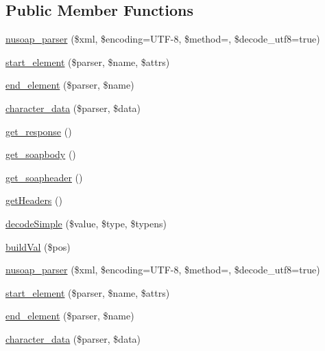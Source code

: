 \subsection*{Public Member Functions}
\begin{DoxyCompactItemize}
\item 
\hyperlink{classnusoap__parser_a0cb4fc7ba2d475205e7a6fcbf187cf23}{nusoap\+\_\+parser} (\$xml, \$encoding=\textquotesingle{}U\+T\+F-\/8\textquotesingle{}, \$method=\textquotesingle{}\textquotesingle{}, \$decode\+\_\+utf8=true)
\item 
\hyperlink{classnusoap__parser_abf9dc4b028eeac08eeca4c7309a950e2}{start\+\_\+element} (\$parser, \$name, \$attrs)
\item 
\hyperlink{classnusoap__parser_ad45367c512cbc2d4679d1a49db3802f2}{end\+\_\+element} (\$parser, \$name)
\item 
\hyperlink{classnusoap__parser_a592a4f9b601cc33f15de0ad7a9c49ae5}{character\+\_\+data} (\$parser, \$data)
\item 
\hyperlink{classnusoap__parser_acf3c69045efc130d3a325c26bd6ac5d0}{get\+\_\+response} ()
\item 
\hyperlink{classnusoap__parser_afa83e4a32b391ea624d012488333c6b1}{get\+\_\+soapbody} ()
\item 
\hyperlink{classnusoap__parser_aeee8c98a38a95c143f807ede81dc06b7}{get\+\_\+soapheader} ()
\item 
\hyperlink{classnusoap__parser_a157e0005d82edaa21cbea07fdc5c62da}{get\+Headers} ()
\item 
\hyperlink{classnusoap__parser_a9094260815e81487fef378ac6222e9a9}{decode\+Simple} (\$value, \$type, \$typens)
\item 
\hyperlink{classnusoap__parser_a8a4609375662042387aa159de2edd196}{build\+Val} (\$pos)
\item 
\hyperlink{classnusoap__parser_a0cb4fc7ba2d475205e7a6fcbf187cf23}{nusoap\+\_\+parser} (\$xml, \$encoding=\textquotesingle{}U\+T\+F-\/8\textquotesingle{}, \$method=\textquotesingle{}\textquotesingle{}, \$decode\+\_\+utf8=true)
\item 
\hyperlink{classnusoap__parser_abf9dc4b028eeac08eeca4c7309a950e2}{start\+\_\+element} (\$parser, \$name, \$attrs)
\item 
\hyperlink{classnusoap__parser_ad45367c512cbc2d4679d1a49db3802f2}{end\+\_\+element} (\$parser, \$name)
\item 
\hyperlink{classnusoap__parser_a592a4f9b601cc33f15de0ad7a9c49ae5}{character\+\_\+data} (\$parser, \$data)
\item 

\end{DoxyCompactItemize}

